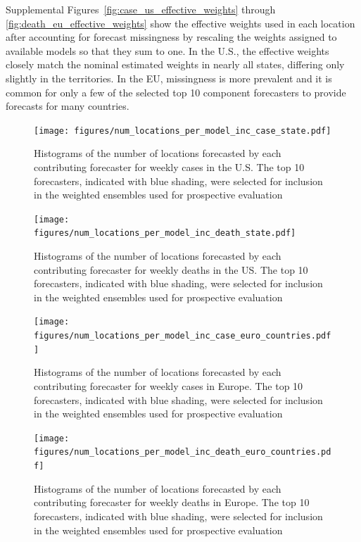 \documentclass{article}
\begin{document}
Supplemental Figures~\ref{fig:case_us_effective_weights} through \ref{fig:death_eu_effective_weights} show the effective weights used in each location after accounting for forecast missingness by rescaling the weights assigned to available models so that they sum to one. In the U.S., the effective weights closely match the nominal estimated weights in nearly all states, differing only slightly in the territories. In the EU, missingness is more prevalent and it is common for only a few of the selected top 10 component forecasters to provide forecasts for many countries.

\begin{figure}
  \texttt{[image: figures/num\_locations\_per\_model\_inc\_case\_state.pdf]}
  \caption{Histograms of the number of locations forecasted by each contributing forecaster for weekly cases in the U.S. The top 10 forecasters, indicated with blue shading, were selected for inclusion in the weighted ensembles used for prospective evaluation}
  \label{fig:case_us_num_locations}
\end{figure}

\begin{figure}
  \texttt{[image: figures/num\_locations\_per\_model\_inc\_death\_state.pdf]}
  \caption{Histograms of the number of locations forecasted by each contributing forecaster for weekly deaths in the US. The top 10 forecasters, indicated with blue shading, were selected for inclusion in the weighted ensembles used for prospective evaluation}
  \label{fig:death_us_num_locations}
\end{figure}

\begin{figure}
  \texttt{[image: figures/num\_locations\_per\_model\_inc\_case\_euro\_countries.pdf]}
  \caption{Histograms of the number of locations forecasted by each contributing forecaster for weekly cases in Europe. The top 10 forecasters, indicated with blue shading, were selected for inclusion in the weighted ensembles used for prospective evaluation}
  \label{fig:case_eu_num_locations}
\end{figure}

\begin{figure}
  \texttt{[image: figures/num\_locations\_per\_model\_inc\_death\_euro\_countries.pdf]}
  \caption{Histograms of the number of locations forecasted by each contributing forecaster for weekly deaths in Europe. The top 10 forecasters, indicated with blue shading, were selected for inclusion in the weighted ensembles used for prospective evaluation}
  \label{fig:death_eu_num_locations}
\end{figure}
\end{document}
